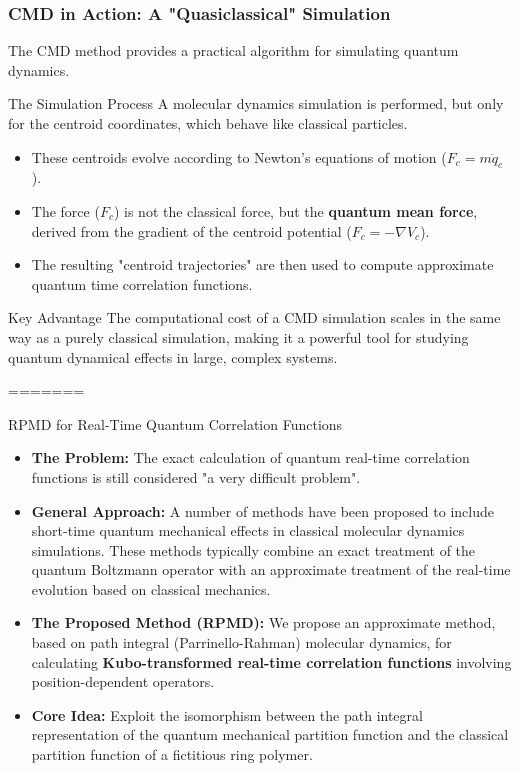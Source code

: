 \begin{frame}
  \frametitle{CMD in Action: A "Quasiclassical" Simulation}
  
  The CMD method provides a practical algorithm for simulating quantum dynamics. \pause
  
  \begin{block}{The Simulation Process}
    A molecular dynamics simulation is performed, but only for the centroid coordinates, which behave like classical particles.
  \end{block} \pause
  
  \begin{itemize}
    \item These centroids evolve according to Newton's equations of motion ($F_c = m \ddot{q}_c$). \pause
    
    \item The force ($F_c$) is not the classical force, but the \textbf{quantum mean force}, derived from the gradient of the centroid potential ($F_c = -\nabla V_c$). \pause
    
    \item The resulting "centroid trajectories" are then used to compute approximate quantum time correlation functions. \pause
  \end{itemize}
  
  \begin{alertblock}{Key Advantage}
    The computational cost of a CMD simulation scales in the same way as a purely classical simulation, making it a powerful tool for studying quantum dynamical effects in large, complex systems.
  \end{alertblock}
\end{frame}
=======
\begin{frame}{RPMD for Real-Time Quantum Correlation Functions}

\begin{itemize}
    \item \textbf{The Problem:} The exact calculation of quantum real-time correlation functions is still considered "a very difficult problem".
    
    \item \textbf{General Approach:} A number of methods have been proposed to include short-time quantum mechanical effects in classical molecular dynamics simulations. These methods typically combine an exact treatment of the quantum Boltzmann operator with an approximate treatment of the real-time evolution based on classical mechanics.
    
    \item \textbf{The Proposed Method (RPMD):} We propose an approximate method, based on path integral (Parrinello-Rahman) molecular dynamics, for calculating \textbf{Kubo-transformed real-time correlation functions} involving position-dependent operators.
    
    \item \textbf{Core Idea:} Exploit the isomorphism between the path integral representation of the quantum mechanical partition function and the classical partition function of a fictitious ring polymer.
\end{itemize}
\end{frame}

